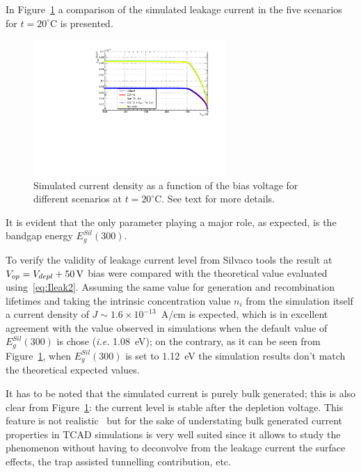 In Figure~\ref{fig:ILeak20C} a comparison of the simulated leakage current in the five scenarios for $t=20^{\circ}$C is presented.
\begin{figure}[!htbp]
\centering
\includegraphics[width=0.65\textwidth]{currents_T20_scenarios.pdf}
\caption{\label{fig:ILeak20C}Simulated current density as a function of the bias voltage for different 
scenarios at $t=20^{\circ}$C. See text for more details.}
\end{figure}
It is evident that the only parameter playing a major role, as expected, is the bandgap energy $E^{Sil}_g(300)$. 



To verify the validity of leakage current level  from Silvaco tools the result at $V_{op}=V_{depl}+50\,{\rm V}$ 
bias 
were compared with the theoretical value evaluated using~\ref{eq:Ileak2}. Assuming the same value
for generation and recombination lifetimes and taking the intrinsic concentration value $n_i$ from 
the simulation itself a current density of $J\sim1.6\times10^{-13}$~A/cm is expected, which 
is in excellent agreement with the value observed in simulations when the default value of 
$E^{Sil}_g(300)$ is chose ({\it i.e.} 1.08~eV); on the contrary, as it can be seen from Figure~\ref{fig:ILeak20C}, when $E^{Sil}_g(300)$ is set to 1.12~eV the simulation results don't match 
the theoretical expected values.

It has to be noted that  the simulated current is purely bulk generated; this is also clear from 
Figure~\ref{fig:ILeak20C}: the current level is stable after the depletion voltage. This feature 
is not realistic~\cite{CALZOLARI19721003} but for the sake of understating bulk generated 
current properties in TCAD simulations is very well suited since it allows to study the 
phenomenon without having to deconvolve from the leakage current the surface effects, the trap assisted 
tunnelling contribution, etc. 

